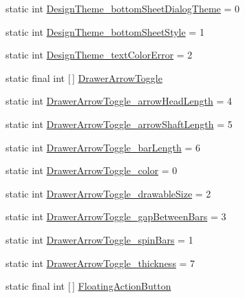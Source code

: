 \begin{DoxyCompactItemize}
\item 
static int \hyperlink{classandroid_1_1support_1_1design_1_1R_1_1styleable_ac81e65cd7cad5fae4da63f17ad8b3e8b}{Design\+Theme\+\_\+bottom\+Sheet\+Dialog\+Theme} = 0
\item 
static int \hyperlink{classandroid_1_1support_1_1design_1_1R_1_1styleable_a1c6c9dd91389f33d763839d8c0b2dfbe}{Design\+Theme\+\_\+bottom\+Sheet\+Style} = 1
\item 
static int \hyperlink{classandroid_1_1support_1_1design_1_1R_1_1styleable_a79782f371783faa40fa7a6a6385de284}{Design\+Theme\+\_\+text\+Color\+Error} = 2
\item 
static final int \mbox{[}$\,$\mbox{]} \hyperlink{classandroid_1_1support_1_1design_1_1R_1_1styleable_a559d22c78738e5161420dc4b41689c1b}{Drawer\+Arrow\+Toggle}
\item 
static int \hyperlink{classandroid_1_1support_1_1design_1_1R_1_1styleable_a04d4c9dc68578489d0d401c435684cfb}{Drawer\+Arrow\+Toggle\+\_\+arrow\+Head\+Length} = 4
\item 
static int \hyperlink{classandroid_1_1support_1_1design_1_1R_1_1styleable_a2dca38b895260aa31773fd2f7f247438}{Drawer\+Arrow\+Toggle\+\_\+arrow\+Shaft\+Length} = 5
\item 
static int \hyperlink{classandroid_1_1support_1_1design_1_1R_1_1styleable_ae52627e17694eb02d691f0e5d355fb74}{Drawer\+Arrow\+Toggle\+\_\+bar\+Length} = 6
\item 
static int \hyperlink{classandroid_1_1support_1_1design_1_1R_1_1styleable_a95f1e87753ba4cd62fef03f1b2635ba1}{Drawer\+Arrow\+Toggle\+\_\+color} = 0
\item 
static int \hyperlink{classandroid_1_1support_1_1design_1_1R_1_1styleable_aa82a02d1c0ba82c43692ec349fddcea0}{Drawer\+Arrow\+Toggle\+\_\+drawable\+Size} = 2
\item 
static int \hyperlink{classandroid_1_1support_1_1design_1_1R_1_1styleable_aa48d199f2cd1185a5c6a23528050d749}{Drawer\+Arrow\+Toggle\+\_\+gap\+Between\+Bars} = 3
\item 
static int \hyperlink{classandroid_1_1support_1_1design_1_1R_1_1styleable_a927e817de79212ffbefd47a7d4fb1a1e}{Drawer\+Arrow\+Toggle\+\_\+spin\+Bars} = 1
\item 
static int \hyperlink{classandroid_1_1support_1_1design_1_1R_1_1styleable_af90c46759c926f94b975e2379b862526}{Drawer\+Arrow\+Toggle\+\_\+thickness} = 7
\item 
static final int \mbox{[}$\,$\mbox{]} \hyperlink{classandroid_1_1support_1_1design_1_1R_1_1styleable_ac39eabec239d50ec950ae5f013825830}{Floating\+Action\+Button}

\end{DoxyCompactItemize}
